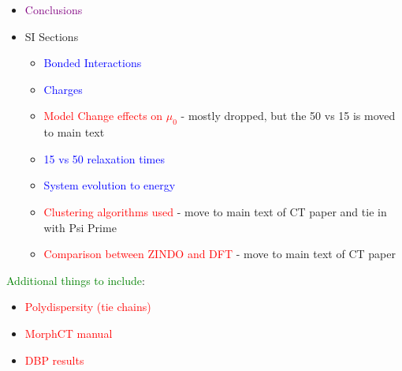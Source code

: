 \documentclass[12pt]{article}
\begin{document}
\begin{itemize}
{\begin{itemize}
        \end{itemize}}
    \item{\textcolor{purple}{Conclusions}}
    \item{SI Sections
        \begin{itemize}
            \item{\textcolor{blue}{Bonded Interactions}}
            \item{\textcolor{blue}{Charges}}
            \item{\textcolor{red}{Model Change effects on $\mu_{0}$} - mostly dropped, but the 50 vs 15 is moved to main text}
            \item{\textcolor{blue}{15 vs 50 relaxation times}}
            \item{\textcolor{blue}{System evolution to energy}}
            \item{\textcolor{red}{Clustering algorithms used} - move to main text of CT paper and tie in with Psi Prime}
            \item{\textcolor{red}{Comparison between ZINDO and DFT} - move to main text of CT paper}
        \end{itemize}}
\end{itemize}

\textcolor{green}{Additional things to include}:

\begin{itemize}
    \item{\textcolor{red}{Polydispersity (tie chains)}}
    \item{\textcolor{red}{MorphCT manual}}
    \item{\textcolor{red}{DBP results}}
\end{itemize}
\end{document}
